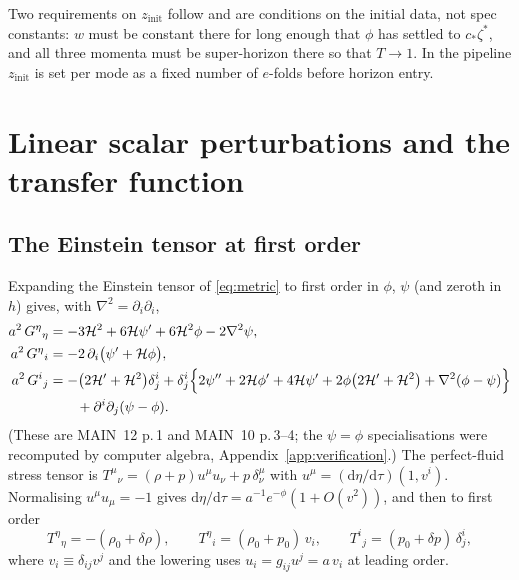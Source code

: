 \documentclass[11pt,a4paper]{article}
\newcommand{\cH}{\mathcal{H}}
\newcommand{\dd}{\mathrm{d}}
\newcommand{\zinit}{z_{\mathrm{init}}}
\newcommand{\cstar}{c_{*}}
\newcommand{\note}[1]{\textsf{#1}}
\theoremstyle{remark}
\begin{document}
Two requirements on $\zinit$ follow and are conditions on the initial data, not spec constants: $w$ must be constant there for long enough that $\phi$ has settled to $\cstar\zeta^*$, and all three momenta must be super-horizon there so that $T\to1$. In the pipeline $\zinit$ is set per mode as a fixed number of $e$-folds before horizon entry.

\section{Linear scalar perturbations and the transfer function}
\label{sec:scalar}

\subsection{The Einstein tensor at first order}

Expanding the Einstein tensor of \eqref{eq:metric} to first order in $\phi$, $\psi$ (and zeroth in $h$) gives, with $\nabla^2 = \partial_i\partial_i$,
\begin{align}
a^2\,G^\eta{}_\eta &= -3\cH^2 + 6\cH\psi' + 6\cH^2\phi - 2\nabla^2\psi,
\label{eq:G00}\\
a^2\,G^\eta{}_i &= -2\,\partial_i\big(\psi' + \cH\phi\big),
\label{eq:G0i}\\
a^2\,G^i{}_j &= -\big(2\cH'+\cH^2\big)\delta^i_j
 + \delta^i_j\Big\{2\psi'' + 2\cH\phi' + 4\cH\psi' + 2\phi\big(2\cH'+\cH^2\big) + \nabla^2(\phi-\psi)\Big\}\notag\\
&\qquad + \partial^i\partial_j(\psi-\phi).
\label{eq:Gij}
\end{align}
(These are \note{MAIN}~12 p.\,1 and \note{MAIN}~10 p.\,3--4; the $\psi=\phi$ specialisations were recomputed by computer algebra, Appendix~\ref{app:verification}.) The perfect-fluid stress tensor is $T^\mu{}_\nu = (\rho+p)u^\mu u_\nu + p\,\delta^\mu_\nu$ with $u^\mu = (\dd\eta/\dd\tau)(1,v^i)$. Normalising $u^\mu u_\mu = -1$ gives $\dd\eta/\dd\tau = a^{-1}e^{-\phi}(1+O(v^2))$, and then to first order
\begin{equation}
T^\eta{}_\eta = -(\rho_0+\delta\rho),\qquad
T^\eta{}_i = (\rho_0+p_0)\,v_i,\qquad
T^i{}_j = (p_0+\delta p)\,\delta^i_j ,
\label{eq:Tmunu-first}
\end{equation}
where $v_i\equiv\delta_{ij}v^j$ and the lowering uses $u_i = g_{ij}u^j = a\,v_i$ at leading order.
\end{document}
